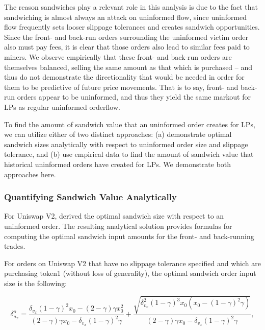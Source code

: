     The reason sandwiches play a relevant role in this analysis is 
    due to the fact that sandwiching is almost always an attack on uninformed flow, since uninformed flow frequently sets looser slippage tolerances and creates sandwich opportunities. 
    Since the front- and back-run orders surrounding the uninformed victim order also must pay fees, it is clear that those orders also lead to similar fees paid to miners. We observe empirically that these front- and back-run orders are themselves balanced, selling the same amount as that which is purchased -- and thus do not demonstrate the directionality that would be needed in order for them to be predictive of future price movements. That is to say, front- and back-run orders appear to be uninformed, and thus they yield the same markout for LPs as regular uninformed orderflow.

    To find the amount of sandwich value that an uninformed order creates for LPs, we can utilize either of two distinct approaches: (a) demonstrate optimal sandwich sizes analytically with respect to uninformed order size and slippage tolerance, and (b) use empirical data to find the amount of sandwich value that historical uninformed orders have created for LPs. We demonstrate both approaches here.

    \subsubsection{Quantifying Sandwich Value Analytically}
        For Uniswap V2, \cite{heimbach2022eliminating} derived the optimal sandwich size with respect to an uninformed order. The resulting analytical solution provides formulas for computing the optimal sandwich input amounts for the front- and back-running trades.

        For orders on Uniswap V2 that have no slippage tolerance specified and which are purchasing token1 (without loss of generality), the optimal sandwich order input size is the following:

        \begin{equation*}
            \delta^o_{a_x} = 
                \frac{\delta_{v_x}(1-\gamma)^2x_0 - (2-\gamma)\gamma x_0^2}{(2-\gamma)\gamma x_0 - \delta_{v_x}(1-\gamma)^2\gamma} 
                + \frac{\sqrt{\delta_{v_x}^2 (1-\gamma)^3x_0(x_0-(1-\gamma)^2\gamma)}}{(2-\gamma)\gamma x_0 - \delta_{v_x}(1-\gamma)^2\gamma},
        \end{equation*}

